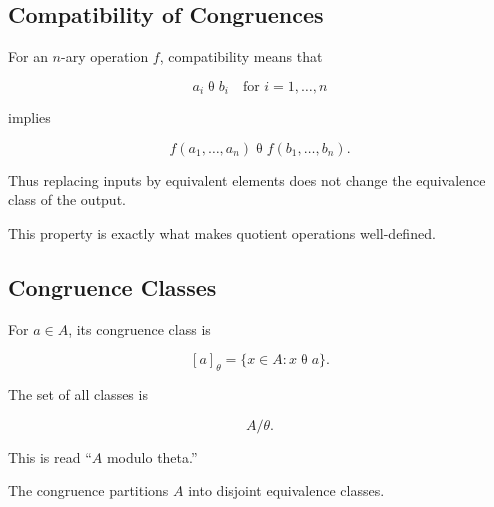 \subsection{Compatibility of Congruences}
\label{subsec:congruence-compatibility}

For an \(n\)-ary operation \(f\), compatibility means that

\[ a_i\mathrel{\theta}b_i
\quad\text{for }i=1,\ldots,n \]

implies

\[ f(a_1,\ldots,a_n)\mathrel{\theta}f(b_1,\ldots,b_n). \]

Thus replacing inputs by equivalent elements does not change the
equivalence class of the output.

This property is exactly what makes quotient operations well-defined.

\subsection{Congruence Classes}
\label{subsec:congruence-classes}

For \(a\in A\), its congruence class is

\[ [a]_\theta=\{x\in A:x\mathrel{\theta}a\}. \]

The set of all classes is

\[ A/\theta. \]

This is read ``\(A\) modulo theta.''

The congruence partitions \(A\) into disjoint equivalence classes.

\begin{center}
\end{center}

